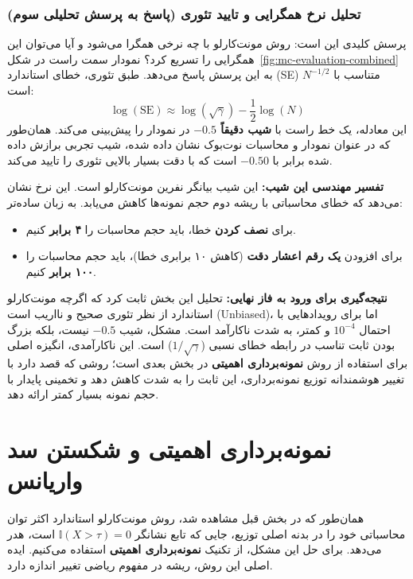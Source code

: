 \documentclass[12pt,a4paper]{article}
\begin{document}
\subsubsection*{تحلیل نرخ همگرایی و تایید تئوری (پاسخ به پرسش تحلیلی سوم)}\label{sec:q3}

پرسش کلیدی این است: روش مونت‌کارلو با چه نرخی همگرا می‌شود و آیا می‌توان این همگرایی را تسریع کرد؟ نمودار سمت راست در شکل~\ref{fig:mc-evaluation-combined} به این پرسش پاسخ می‌دهد. طبق تئوری، خطای استاندارد (SE) متناسب با $N^{-1/2}$ است:
\[
\log(\text{SE}) \approx \log(\sqrt{\gamma}) - \frac{1}{2}\log(N)
\]
این معادله، یک خط راست با \textbf{شیب دقیقاً $-0.5$} در نمودار  را پیش‌بینی می‌کند. همان‌طور که در عنوان نمودار و محاسبات نوت‌بوک نشان داده شده، شیب تجربی برازش داده شده برابر با \textbf{$-0.50$} است که با دقت بسیار بالایی تئوری را تایید می‌کند.

\textbf{تفسیر مهندسی این شیب:} این شیب بیانگر نفرین مونت‌کارلو  است. این نرخ نشان می‌دهد که خطای محاسباتی با ریشه دوم حجم نمونه‌ها کاهش می‌یابد. به زبان ساده‌تر:
\begin{itemize}
	\item برای \textbf{نصف کردن} خطا، باید حجم محاسبات را \textbf{۴ برابر} کنیم.
	\item برای افزودن \textbf{یک رقم اعشار دقت} (کاهش ۱۰ برابری خطا)، باید حجم محاسبات را \textbf{۱۰۰ برابر} کنیم.
\end{itemize}

\textbf{نتیجه‌گیری برای ورود به فاز نهایی:} تحلیل این بخش ثابت کرد که اگرچه مونت‌کارلو استاندارد از نظر تئوری صحیح و نااریب است (Unbiased)، اما برای رویدادهایی با احتمال $10^{-4}$ و کمتر، به شدت ناکارآمد است. مشکل، شیب $ -0.5$ نیست، بلکه بزرگ بودن ثابت تناسب در رابطه خطای نسبی ($1/\sqrt{\gamma}$) است. این ناکارآمدی، انگیزه اصلی برای استفاده از روش \textbf{نمونه‌برداری اهمیتی } در بخش بعدی است؛ روشی که قصد دارد با تغییر هوشمندانه توزیع نمونه‌برداری، این ثابت را به شدت کاهش دهد و تخمینی پایدار با حجم نمونه بسیار کمتر ارائه دهد.


	\section{نمونه‌برداری اهمیتی  و شکستن سد واریانس}
	
	همان‌طور که در بخش قبل مشاهده شد، روش مونت‌کارلو استاندارد  اکثر توان محاسباتی خود را در بدنه اصلی توزیع، جایی که تابع نشانگر $\mathbb{I}(X > \tau) = 0$ است، هدر می‌دهد. برای حل این مشکل، از تکنیک \textbf{نمونه‌برداری اهمیتی } استفاده می‌کنیم. ایده اصلی این روش، ریشه در مفهوم ریاضی تغییر اندازه  دارد.
	
\end{document}
